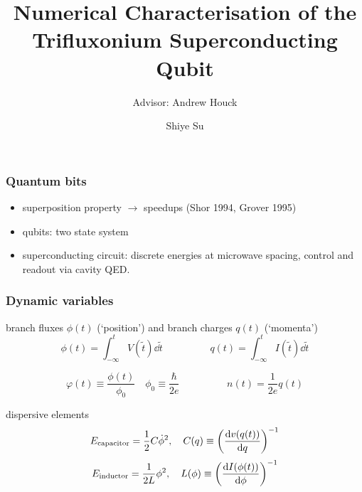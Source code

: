 \documentclass[10pt]{beamer}
\title{Numerical Characterisation of the Trifluxonium Superconducting Qubit}
\subtitle{Advisor: Andrew Houck}
\author{Shiye Su}
\institute{Princeton University}
\date{}
\begin{document}
\begin{frame}
\titlepage
\end{frame}


\begin{frame}
\frametitle{Quantum bits}
\begin{itemize}
\item superposition property $\rightarrow$ speedups (Shor 1994, Grover 1995)
\item qubits: two state system
\item superconducting circuit: discrete energies at microwave spacing, control and readout via cavity QED.
\end{itemize}
\end{frame}



\begin{frame}[shrink=10]
\frametitle{Dynamic variables}
\vspace{3ex}
branch fluxes $\phi(t)$ (`position') and branch charges $q(t)$ (`momenta')
\begin{equation}
\phi(t) = \int_{-\infty}^t V(\tilde{t}) \dd{\tilde{t}}
\hspace{2cm}
q(t) = \int_{-\infty}^t I(\tilde{t}) \dd{\tilde{t}}
\end{equation}

\begin{equation}
\varphi(t) \equiv \frac{\phi(t)}{\phi_0}
\quad \phi_0 \equiv \frac{\hbar}{2e}
\hspace{2cm}
n(t) = \frac{1}{2e} q(t)
\end{equation}

dispersive elements
\begin{equation}
E_\text{capacitor} = \frac{1}{2} C \dot{\phi}^2, 
\quad
C(q) \equiv \left( \dv{v(q(t))}{q} \right)^{-1}
\end{equation}
\begin{equation}
E_\text{inductor} = \frac{1}{2L} \phi^2,
\quad
L(\phi) \equiv \left( \dv{I(\phi(t))}{\phi} \right)^{-1}
\end{equation}
\end{frame}

\end{document}
